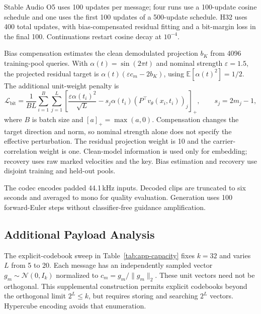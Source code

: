 \documentclass[11pt]{article}
\begin{document}
Stable Audio O5 uses 100 updates per message; four runs use a 100-update
cosine schedule and one uses the first 100 updates of a 500-update
schedule. H32 uses 400 total updates, with bias-compensated residual
fitting and a bit-margin loss in the final 100. Continuations restart
cosine decay at $10^{-4}$.

Bias compensation estimates the clean demodulated projection $b_K$
from 4096 training-pool queries. With $\alpha(t)=\sin(2\pi t)$ and
nominal strength $\varepsilon=1.5$, the projected residual target is
$\alpha(t)(\varepsilon c_m-2b_K)$, using
$\mathbb E[\alpha(t)^2]=1/2$. The additional unit-weight penalty is
\begin{equation}
\mathcal L_{\mathrm{bit}}=\frac{1}{BL}\sum_{i=1}^B\sum_{j=1}^L
\left[\frac{\varepsilon\alpha(t_i)^2}{\sqrt L}
-s_j\alpha(t_i)(P^\top v_\theta(x_i,t_i))_j\right]_+,
\qquad s_j=2m_j-1,
\end{equation}
where $B$ is batch size and $[a]_+=\max(a,0)$. Compensation changes the
target direction and norm, so nominal strength alone does not specify
the effective perturbation. The residual projection weight is 10 and
the carrier-correlation weight is one. Clean-model information is used
only for embedding; recovery uses raw marked velocities and the key.
Bias estimation and recovery use disjoint training and held-out pools.

The codec encodes padded 44.1\,kHz inputs. Decoded clips are truncated
to six seconds and averaged to mono for quality evaluation. Generation
uses 100 forward-Euler steps without classifier-free guidance
amplification.

\subsection{Additional Payload Analysis}\label{app:tables}
\label{app:payload}

The explicit-codebook sweep in Table~\ref{tab:app-capacity} fixes
$k=32$ and varies $L$ from 5 to 20. Each message has an independently
sampled vector $g_m\sim\mathcal N(0,I_k)$ normalized to
$c_m=g_m/\|g_m\|_2$. These unit vectors need not be orthogonal.
This supplemental construction permits explicit codebooks beyond the
orthogonal limit $2^L\leq k$, but requires storing and searching $2^L$
vectors. Hypercube encoding avoids that enumeration.
\end{document}
